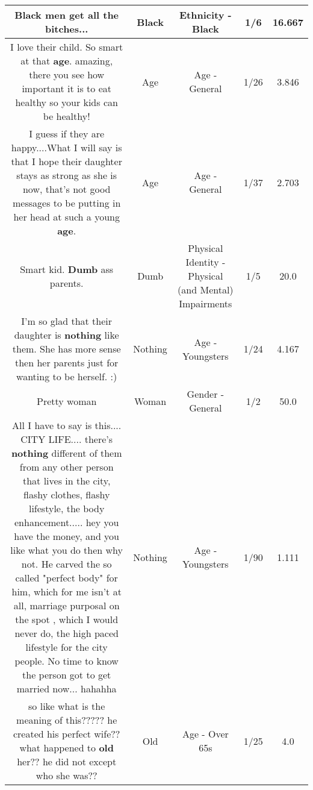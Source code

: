 \documentclass[11pt]{article}
\newlength\mylength
\begin{document}
\begin{center}
\begin{longtable}{|C{.65\mylength}|C{.30\mylength}|C{.12\mylength}|C{.12\mylength}|C{.12\mylength}|}
  \small Black men get all the bitches...\normalsize   & Black & Ethnicity - Black & 1/6 & 16.667 \\  \hline
  \small I love their child. So smart at that \textbf{age}. amazing, there you see how important it is to eat healthy so your kids can be healthy!\normalsize   & Age & Age - General & 1/26 & 3.846 \\  \hline
  \small I guess if they are happy....What I will say is that I hope their daughter stays as strong as she is now, that's not good messages to be putting in her head at such a young \textbf{age}.\normalsize   & Age & Age - General & 1/37 & 2.703 \\  \hline
  \small Smart kid. \textbf{Dumb} ass parents.\normalsize   & Dumb & Physical Identity - Physical (and Mental) Impairments & 1/5 & 20.0 \\  \hline
  \small I'm so glad that their daughter is \textbf{nothing} like them. She has more sense then her parents just for wanting to be herself. :)\normalsize   & Nothing & Age - Youngsters & 1/24 & 4.167 \\  \hline
  \small Pretty woman\normalsize   & Woman & Gender - General & 1/2 & 50.0 \\  \hline
  \small All I have to say is this.... CITY LIFE.... there's \textbf{nothing} different of them from any other person that lives in the city, flashy clothes, flashy lifestyle, the body enhancement..... hey you have the money, and you like what you do then why not. He carved the so called "perfect body" for him, which for me isn't at all, marriage purposal on the spot , which I would never do, the high paced lifestyle for the city people. No time to know the person got to get married now... hahahha\normalsize   & Nothing & Age - Youngsters & 1/90 & 1.111 \\  \hline
  \small so like what is the meaning of this????? he created his perfect wife?? what happened to \textbf{old} her?? he did not except who she was??\normalsize   & Old & Age - Over 65s & 1/25 & 4.0 \\  \hline

\end{longtable}
\end{center}
\end{document}
